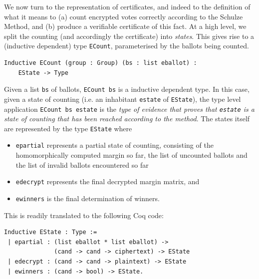  We now turn to the representation of certificates, and indeed to the
  definition of what it means to (a) count encrypted votes correctly
  according to the Schulze Method, and (b) produce a verifiable
  certificate of this fact. At a high level, we split the counting
  (and accordingly the certificate) into \emph{states}. This gives
  rise to a (inductive dependent) type \texttt{ECount}, parameterised
  by the ballots being counted.

  \begin{lstlisting}[frame=single,basicstyle=\ttfamily\footnotesize]
  Inductive ECount (group : Group) (bs : list eballot) : 
    EState -> Type
  \end{lstlisting}

  \noindent
  Given a list \texttt{bs} of ballots, \texttt{ECount bs} is a
  inductive dependent type. In this case, given a state of counting
  (i.e. an inhabitant \texttt{estate} of \texttt{EState}), the type level application
  \texttt{ECount bs estate} is the \emph{type of evidence that proves
  that \texttt{estate} is a state of counting that has been reached
  according to the method}.  The states itself are represented by
  the type \texttt{EState}
where
\begin{itemize}
 \item \texttt{epartial} represents a partial state of counting,
 consisting of the homomorphically computed margin so far, the list
 of uncounted ballots and the list of invalid ballots encountered so
 far
 \item \texttt{edecrypt} represents the final decrypted margin
 matrix, and 
 \item \texttt{ewinners} is the final determination of winners. 
\end{itemize}
This is readily translated to the following Coq code:
 
\begin{lstlisting}[frame=single,basicstyle=\ttfamily\footnotesize]
Inductive EState : Type :=
 | epartial : (list eballot * list eballot) ->
              (cand -> cand -> ciphertext) -> EState
 | edecrypt : (cand -> cand -> plaintext) -> EState
 | ewinners : (cand -> bool) -> EState.
\end{lstlisting}




